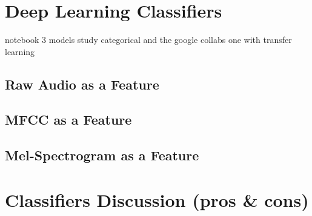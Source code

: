 
\section{Deep Learning Classifiers}

notebook  3 models study categorical and the google collabs one with transfer learning\\

\subsection{Raw Audio as a Feature}
\subsection{MFCC as a Feature}
\subsection{Mel-Spectrogram as a Feature}


\section{Classifiers Discussion (pros \& cons)}

